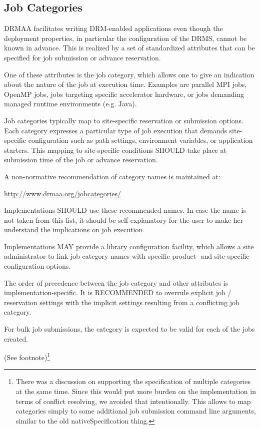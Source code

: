 \documentclass{article}
\newcommand{\rat}[1]{ {\tiny(See footnote)}\footnote{#1} }
\begin{document}
\subsection{Job Categories}
\label{sec:jobcategories}

DRMAA facilitates writing DRM-enabled applications even though the deployment properties, in particular the configuration of the DRMS, cannot be known in advance. This is realized by a set of standardized attributes that can be specified for job submission or advance reservation.

One of these attributes is the job category, which allows one to give an indication about the nature of the job at execution time. Examples are parallel MPI jobs, OpenMP jobs, jobs targeting specific accelerator hardware, or jobs demanding managed runtime environments (e.g. Java). 

Job categories typically map to site-specific reservation or submission options. Each category expresses a particular type of job execution that demands site-specific configuration such as path settings, environment variables, or application starters. This mapping to site-specific conditions SHOULD take place at submission time of the job or advance reservation.

A non-normative recommendation of category names is maintained at:

\url{http://www.drmaa.org/jobcategories/}

Implementations SHOULD use these recommended names. In case the name is not taken from this list, it should be self-explanatory for the user to make her understand the implications on job execution. 

Implementations MAY provide a library configuration facility, which allows a site administrator to link job category names with specific product- and site-specific configuration options.

The order of precedence between the job category and other attributes is implementation-specific. It is RECOMMENDED to overrule explicit job / reservation settings with the implicit settings resulting from a conflicting job category.

For bulk job submissions, the category is expected to be valid for each of the jobs created.

\rat{There was a discussion on supporting the specification of multiple categories at the same time. Since this would put more burden on the implementation in terms of conflict resolving, we avoided that intentionally. This allows to map categories simply to some additional job submission command line arguments, similar to the old nativeSpecification thing.}
\end{document}

